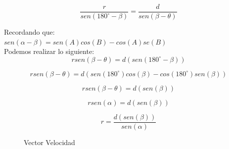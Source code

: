\documentclass[a4paper,11pt]{scrartcl}
\begin{document}
\begin{center}
\begin{equation}
\frac{r}{sen(180^{\circ} - \beta)} = \frac{d}{sen(\beta - \theta)}
\end{equation}

Recordando que:\\
\hfill \break
$sen(\alpha - \beta) = sen(A)cos(B) - cos(A)se(B)$\\
\hfill \break
Podemos realizar lo siguiente:\\

\begin{equation}
r sen(\beta - \theta) = d (sen(180^{\circ} - \beta))
\end{equation}

\begin{equation}
r sen(\beta - \theta) = d (sen(180^{\circ})cos(\beta) - cos(180^{\circ})sen(\beta))
\end{equation}

\begin{equation}
r sen(\beta - \theta) = d (sen(\beta))
\end{equation}

\begin{equation}
r sen(\alpha) = d (sen(\beta))
\end{equation}

\begin{equation}
r = \frac{d(sen(\beta))}{sen(\alpha)}
\end{equation}

\begin{figure}[htbp]
\centering
{}
\caption{Vector Velocidad}
\label{fig:vector_velocidad}
\end{figure}


\end{center}
\end{document}
